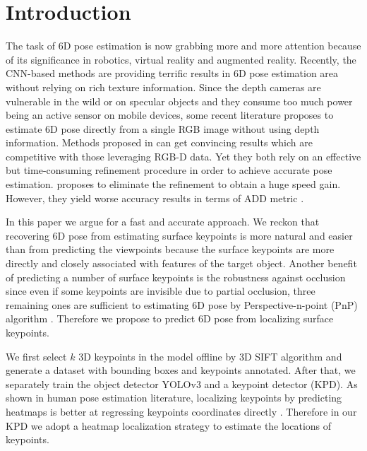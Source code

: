\documentclass[10pt,twocolumn,letterpaper]{article}
\begin{document}
\section{Introduction}
The task of 6D pose estimation is now grabbing more and more attention because of its significance in robotics, virtual reality and augmented reality. Recently, the CNN-based methods \cite{Kehl2017SSD6DMR, Rad2017BB8AS, tekin18, 7298758, xiang2018posecnn} are providing terrific results in 6D pose estimation area without relying on rich texture information. Since the depth cameras are vulnerable in the wild or on specular objects and they consume too much power being an active sensor on mobile devices, some recent literature \cite{Kehl2017SSD6DMR, Rad2017BB8AS, tekin18} proposes to estimate 6D pose directly from a single RGB image without using depth information. Methods proposed in \cite{Kehl2017SSD6DMR, Rad2017BB8AS} can get convincing results which are competitive with those leveraging RGB-D data. Yet they both rely on an effective but time-consuming refinement procedure in order to achieve accurate pose estimation. \cite{tekin18} proposes to eliminate the refinement to obtain a huge speed gain. However, they yield worse accuracy results in terms of ADD metric \cite{Hinterstoisser:2012:MBT:2481913.2481959}.

In this paper we argue for a fast and accurate approach. We reckon that recovering 6D pose from estimating surface keypoints is more natural and easier than from predicting the viewpoints because the surface keypoints are more directly and closely associated with features of the target object. Another benefit of predicting a number of surface keypoints is the robustness against occlusion since even if some keypoints are invisible due to partial occlusion, three remaining ones are sufficient to estimating 6D pose by Perspective-n-point (PnP) algorithm \cite{Lepetit2008EPnPAA}. Therefore we propose to predict 6D pose from localizing surface keypoints.

We first select $k$ 3D keypoints in the model offline by 3D SIFT algorithm \cite{Scovanner:2007:SDA:1291233.1291311} and generate a dataset with bounding boxes and keypoints annotated. After that, we separately train the object detector YOLOv3 \cite{DBLP:journals/corr/abs-1804-02767} and a keypoint detector (KPD). As shown in human pose estimation literature, localizing keypoints by predicting heatmaps \cite{Newell2016StackedHN, tompson2014joint, wei2016convolutional} is better at regressing keypoints coordinates directly \cite{toshev2014deeppose}. Therefore in our KPD we adopt a heatmap localization strategy to estimate the locations of keypoints.
\end{document}
